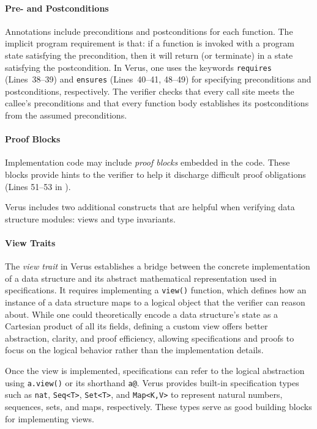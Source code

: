 \paragraph{Pre- and Postconditions}
Annotations include preconditions and postconditions for each function. The implicit program requirement is that: if a function is invoked with a program state satisfying the precondition, then it will return (or terminate) in a state satisfying the postcondition. In Verus, one uses the keywords \texttt{requires} (Lines~38--39) and \texttt{ensures} (Lines~40--41, 48--49) for specifying preconditions and postconditions, respectively. The verifier checks that every call site meets the callee's preconditions and that every function body establishes its postconditions from the assumed preconditions. 

\paragraph{Proof Blocks}
Implementation code may include \emph{proof blocks} embedded in the code.  These blocks provide hints to the verifier to help it discharge difficult proof obligations (Lines 51--53 in ). 

Verus includes two additional constructs that are helpful when verifying data structure modules: views and type invariants.

\paragraph{View Traits}
The \emph{view trait} in Verus establishes a bridge between the concrete implementation of a data structure and its abstract mathematical representation used in specifications.
It requires implementing a \texttt{view()} function, which defines how an instance of a data structure maps to a logical object that the verifier can reason about. %
While one could theoretically encode a data structure's state as a Cartesian product of all its fields, defining a custom view offers better abstraction, clarity, and proof efficiency, allowing specifications and proofs to focus on the logical behavior rather than the implementation details.

Once the view is implemented, specifications can refer to the logical abstraction using \texttt{a.view()} or its shorthand \texttt{a@}. Verus provides built-in specification types such as \texttt{nat}, \texttt{Seq<T>}, \texttt{Set<T>}, and \texttt{Map<K,V>} to represent natural numbers, sequences, sets, and maps, respectively. These types serve as good building blocks for implementing views.

